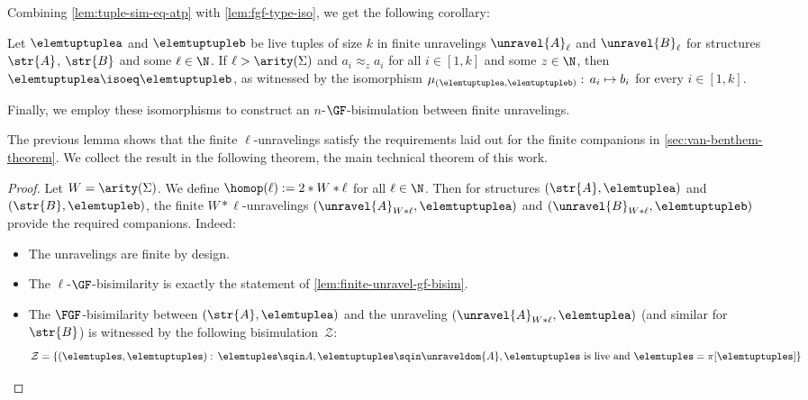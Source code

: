 Combining \cref{lem:tuple-sim-eq-atp} with \cref{lem:fgf-type-iso}, we get the following corollary:
\begin{corollary}\label{cor:tuple-similar-iso}
  Let $\elemtuptuplea$ and $\elemtuptupleb$ be live tuples of size $k$ in finite unravelings $\unravel{A}_{\ell}$ and $\unravel{B}_{\ell}$ for structures $\str{A}$, $\str{B}$ and some $\ell \in \N$.
  If $\ell > \arity(\Sigma)$ and $a_{i} \approx_{z} a_{i}$ for all $i \in [1,k]$ and some $z \in \N$, then $\elemtuptuplea \isoeq \elemtuptupleb$, as witnessed by the isomorphism $\mu_{(\elemtuptuplea, \elemtuptupleb)}:\, a_{i} \mapsto b_{i}$ for every $i \in [1, k]$.
\end{corollary}
Finally, we employ these isomorphisms to construct an $n$-$\GF$-bisimulation between finite unravelings.


The previous lemma shows that the finite $\ell$-unravelings satisfy the requirements laid out for the finite companions in \cref{sec:van-benthem-theorem}.
We collect the result in the following theorem, the main technical theorem of this work.
\maintechnicalthm
\begin{proof}
  Let $W = \arity(\Sigma)$. We define $\homop(\ell) := 2 * W * \ell$ for all $\ell \in \N$.
  Then for structures $(\str{A}, \elemtuplea)$ and $(\str{B}, \elemtupleb)$, the finite $W * \ell$-unravelings $(\unravel{A}_{W * \ell}, \elemtuptuplea)$ and $(\unravel{B}_{W * \ell}, \elemtuptupleb)$ provide the required companions.
  Indeed:
  \begin{itemize}
    \item The unravelings are finite by design.
    \item The $\ell$-$\GF$-bisimilarity is exactly the statement of \cref{lem:finite-unravel-gf-bisim}.
    \item The $\FGF$-bisimilarity between $(\str{A}, \elemtuplea)$ and the unraveling $(\unravel{A}_{W * \ell}, \elemtuplea)$ (and similar for $\str{B}$) is witnessed by the following bisimulation~$\mathcal{Z}$:
          \begin{equation*}
            \mathcal{Z} = \{ (\elemtuples, \elemtuptuples):\, \elemtuples \sqin A, \elemtuptuples \sqin \unraveldom{A}, \elemtuptuples \text{ is live and } \elemtuples = \pi[\elemtuptuples] \}
          \end{equation*}
  \end{itemize}
\end{proof}
